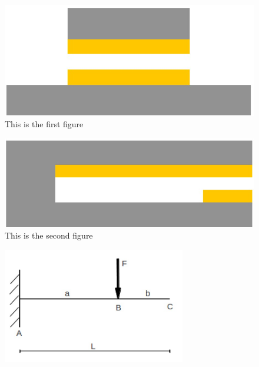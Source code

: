 \begin{minipage}{\linewidth}
	\centering
	\begin{minipage}{0.35\linewidth}
		\begin{figure}[H]
	    	\includegraphics[width=\linewidth]{fig/cant_single_front.jpg}
	    	\caption{This is the first figure}
		\end{figure}
	\end{minipage}
	\hspace{0.05\linewidth}
	\begin{minipage}{0.35\linewidth}
		\begin{figure}[H]
	    	\includegraphics[width=\linewidth]{fig/cant_single_side.jpg}
	    	\caption{This is the second figure}
		\end{figure}
	\end{minipage}
\end{minipage}

\begin{figure}[h]
	\centering
	\includegraphics[width=8cm]{fig/cantilever_beam_single_load.png}
	\label{fig:cantilever_beam_single_load}
\end{figure}

